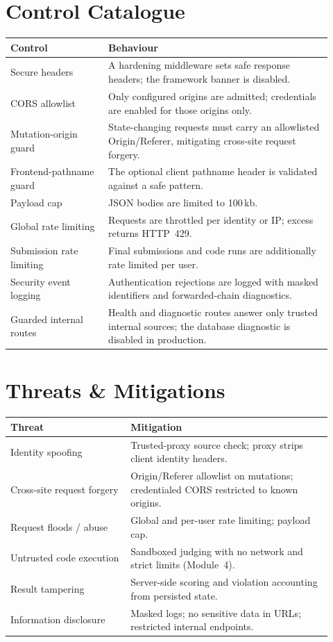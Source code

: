 \documentclass[12pt,a4paper,oneside]{report}
\begin{document}
\section{Control Catalogue}
\begin{longtable}{@{}p{0.28\linewidth} p{0.64\linewidth}@{}}
\toprule
\textbf{Control} & \textbf{Behaviour}\\
\midrule
\endhead
Secure headers & A hardening middleware sets safe response headers; the framework banner is disabled.\\
CORS allowlist & Only configured origins are admitted; credentials are enabled for those origins only.\\
Mutation-origin guard & State-changing requests must carry an allowlisted Origin/Referer, mitigating cross-site request forgery.\\
Frontend-pathname guard & The optional client pathname header is validated against a safe pattern.\\
Payload cap & JSON bodies are limited to 100\,kb.\\
Global rate limiting & Requests are throttled per identity or IP; excess returns HTTP~429.\\
Submission rate limiting & Final submissions and code runs are additionally rate limited per user.\\
Security event logging & Authentication rejections are logged with masked identifiers and forwarded-chain diagnostics.\\
Guarded internal routes & Health and diagnostic routes answer only trusted internal sources; the database diagnostic is disabled in production.\\
\bottomrule
\end{longtable}

\section{Threats \& Mitigations}
\begin{longtable}{@{}p{0.34\linewidth} p{0.58\linewidth}@{}}
\toprule
\textbf{Threat} & \textbf{Mitigation}\\
\midrule
\endhead
Identity spoofing & Trusted-proxy source check; proxy strips client identity headers.\\
Cross-site request forgery & Origin/Referer allowlist on mutations; credentialed CORS restricted to known origins.\\
Request floods / abuse & Global and per-user rate limiting; payload cap.\\
Untrusted code execution & Sandboxed judging with no network and strict limits (Module~4).\\
Result tampering & Server-side scoring and violation accounting from persisted state.\\
Information disclosure & Masked logs; no sensitive data in URLs; restricted internal endpoints.\\
\bottomrule
\end{longtable}
\end{document}
